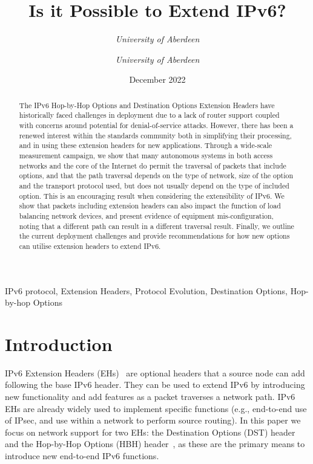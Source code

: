 \documentclass[conference]{IEEEtran}
\title{Is it Possible to Extend IPv6?}
\date{December 2022}
\author{\IEEEauthorblockN{Ana Custura}
\IEEEauthorblockA{
\textit{University of Aberdeen}\\
}
\and
\IEEEauthorblockN{Raffaello Secchi}
\textit{University of Aberdeen}\\
\and
\IEEEauthorblockN{Gorry Fairhurst}
\textit{University of Aberdeen}\\
}
\begin{document}
\maketitle

\begin{abstract}
The IPv6 Hop-by-Hop Options and Destination Options Extension Headers have historically faced challenges in deployment due to a lack of router support coupled with concerns around potential for denial-of-service attacks. However, there has been a renewed interest within the standards community both in simplifying their processing, and in using these extension headers for new applications. 
Through a wide-scale measurement campaign, we show that many autonomous systems in both access networks and the core of the Internet do permit the traversal of packets that include options, and that the path traversal depends on the type of network, size of the option and the transport protocol used, but does not usually depend on the type of included option. This is an encouraging result when considering the extensibility of IPv6. We show that packets including extension headers can also impact the function of load balancing network devices, and present evidence of equipment mis-configuration, noting that a different path can result in a different traversal result. Finally, we outline the current deployment challenges and provide recommendations for how new options can utilise extension headers to extend IPv6.

\end{abstract}

\begin{IEEEkeywords}
IPv6 protocol, Extension Headers, Protocol Evolution, Destination Options, Hop-by-hop Options
\end{IEEEkeywords}

\section{Introduction}
\label{sec:introduction}

IPv6 Extension Headers (EHs)~\cite{RFC8200} are optional headers that a source node can
add following the base IPv6 header. They can be used to extend IPv6 by introducing new functionality and add features as a packet traverses a network path.  
IPv6 EHs are already widely used to implement specific functions (e.g., end-to-end use of IPsec, and use within a network to perform source routing).
In this paper we focus on network support for two EHs: the Destination Options (DST) header and the Hop-by-Hop Options (HBH) header~\cite{rfc9098}, as these are the primary means to introduce new end-to-end IPv6 functions.
\end{document}
